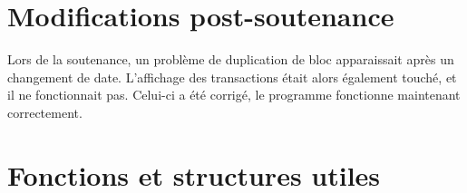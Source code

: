 \documentclass[
	12pt, %
]{fphw}
\begin{document}
%
%	
%    
%	
%
%
%
%
\section*{Modifications post-soutenance}
Lors de la soutenance, un problème de duplication de bloc apparaissait après un changement de date. L'affichage des transactions était alors également touché, et il ne fonctionnait pas. Celui-ci a été corrigé, le programme fonctionne maintenant correctement.

\section*{Fonctions et structures utiles}
\begin{problem}
	
\end{problem}
\end{document}
